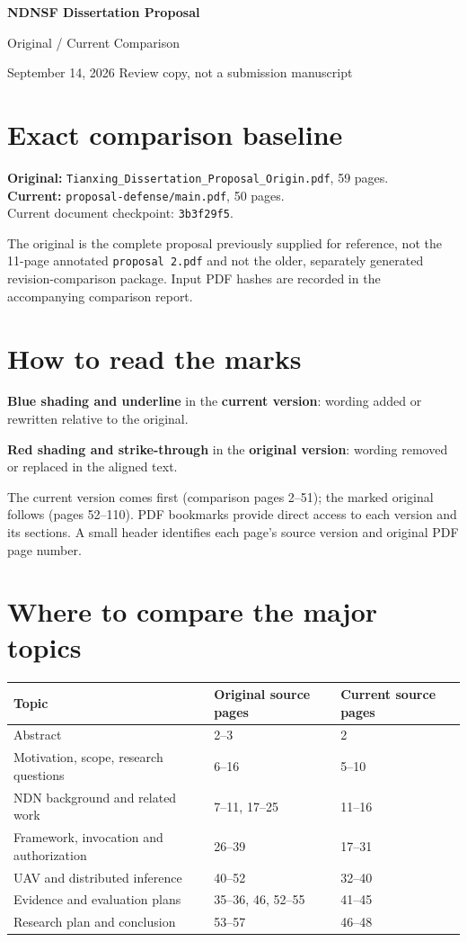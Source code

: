 \documentclass[11pt,letterpaper]{article}
\begin{document}
{\LARGE\bfseries NDNSF Dissertation Proposal}\par
{\Large Original / Current Comparison}\par
September 14, 2026 \hfill Review copy, not a submission manuscript

\section*{Exact comparison baseline}
\textbf{Original:} \texttt{Tianxing\_Dissertation\_Proposal\_Origin.pdf}, 59 pages.\\
\textbf{Current:} \texttt{proposal-defense/main.pdf}, 50 pages.\\
Current document checkpoint: \texttt{3b3f29f5}.

The original is the complete proposal previously supplied for reference, not
the 11-page annotated \texttt{proposal 2.pdf} and not the older, separately
generated revision-comparison package. Input PDF hashes are recorded in the
accompanying comparison report.

\section*{How to read the marks}
\textcolor{blue!65!black}{\textbf{Blue shading and underline}} in the
\textbf{current version}: wording added or rewritten relative to the original.

\textcolor{red!70!black}{\textbf{Red shading and strike-through}} in the
\textbf{original version}: wording removed or replaced in the aligned text.

The current version comes first (comparison pages 2--51); the marked original
follows (pages 52--110). PDF bookmarks provide direct access to each version
and its sections. A small header identifies each page's source version and
original PDF page number.

\section*{Where to compare the major topics}
\small
\renewcommand{\arraystretch}{1.15}
\begin{tabularx}{\linewidth}{@{}Xll@{}}
\toprule
Topic & Original source pages & Current source pages \\
\midrule
Abstract & 2--3 & 2 \\
Motivation, scope, research questions & 6--16 & 5--10 \\
NDN background and related work & 7--11, 17--25 & 11--16 \\
Framework, invocation and authorization & 26--39 & 17--31 \\
UAV and distributed inference & 40--52 & 32--40 \\
Evidence and evaluation plans & 35--36, 46, 52--55 & 41--45 \\
Research plan and conclusion & 53--57 & 46--48 \\
\bottomrule
\end{tabularx}
\normalsize
\end{document}
